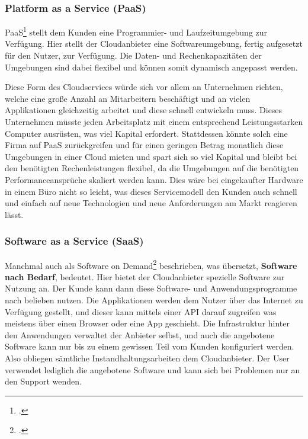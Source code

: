 \subsubsection{Platform as a Service (PaaS)}
PaaS\footcite{cloud-ms} stellt dem Kunden eine Programmier- und Laufzeitumgebung zur Verfügung. Hier stellt der Cloudanbieter eine Softwareumgebung, fertig
aufgesetzt für den Nutzer, zur Verfügung. Die Daten- und Rechenkapazitäten
der Umgebungen sind dabei flexibel und können somit dynamisch angepasst werden.

Diese Form des Cloudservices würde sich vor allem an Unternehmen richten, welche eine große Anzahl an Mitarbeitern beschäftigt und an vielen Applikationen gleichzeitig arbeitet und diese schnell entwickeln muss. 
Dieses Unternehmen müsste jeden Arbeitsplatz mit einem entsprechend Leistungsstarken Computer ausrüsten, was viel Kapital erfordert. Stattdessen könnte solch eine Firma auf PaaS zurückgreifen und für einen geringen Betrag monatlich diese Umgebungen in einer Cloud mieten und spart sich so viel Kapital und bleibt bei den benötigten
Rechenleistungen flexibel, da die Umgebungen auf die benötigten Performanceansprüche skaliert werden kann. Dies wäre bei eingekaufter Hardware in einem Büro nicht so leicht, was dieses Servicemodell den Kunden auch schnell und einfach auf neue Technologien und neue Anforderungen am Markt reagieren lässt.


\subsubsection{Software as a Service (SaaS)}
Manchmal auch als Software on Demand\footcite{cloud-computing} beschrieben, was übersetzt, \textbf{Software nach Bedarf}, bedeutet.
Hier bietet der Cloudanbieter spezielle Software zur Nutzung an. Der Kunde kann dann diese Software- und Anwendungsprogramme nach belieben nutzen.
Die Applikationen werden dem Nutzer über das Internet zu Verfügung gestellt, 
und dieser kann mittels einer API darauf zugreifen was meistens über einen Browser oder eine App geschieht.
Die Infrastruktur hinter den Anwendungen verwaltet der Anbieter selbst, und auch die angebotene Software kann nur bis zu einem gewissen Teil vom Kunden konfiguriert werden.
Also obliegen sämtliche Instandhaltungsarbeiten dem Cloudanbieter.
Der User verwendet lediglich die angebotene Software und kann sich bei Problemen nur an den Support wenden.

